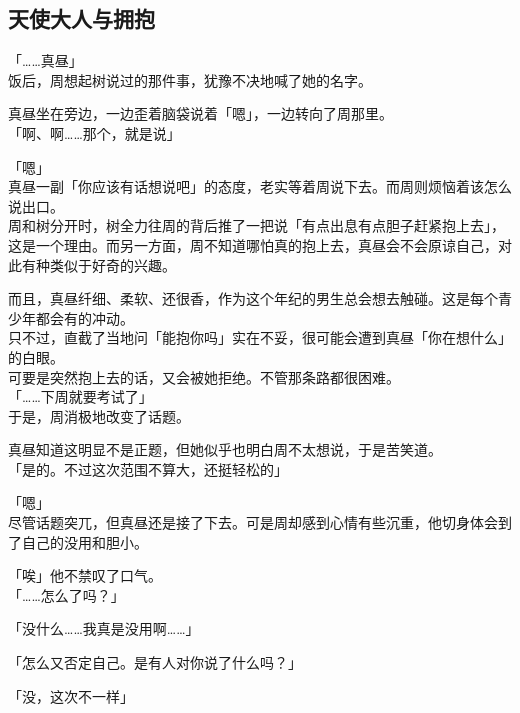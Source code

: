 \subsection{天使大人与拥抱}

「……真昼」\\

饭后，周想起树说过的那件事，犹豫不决地喊了她的名字。

真昼坐在旁边，一边歪着脑袋说着「嗯」，一边转向了周那里。\\

「啊、啊……那个，就是说」

「嗯」\\

真昼一副「你应该有话想说吧」的态度，老实等着周说下去。而周则烦恼着该怎么说出口。\\

周和树分开时，树全力往周的背后推了一把说「有点出息有点胆子赶紧抱上去」，这是一个理由。而另一方面，周不知道哪怕真的抱上去，真昼会不会原谅自己，对此有种类似于好奇的兴趣。

而且，真昼纤细、柔软、还很香，作为这个年纪的男生总会想去触碰。这是每个青少年都会有的冲动。\\

只不过，直截了当地问「能抱你吗」实在不妥，很可能会遭到真昼「你在想什么」的白眼。\\

可要是突然抱上去的话，又会被她拒绝。不管那条路都很困难。\\

「……下周就要考试了」\\

于是，周消极地改变了话题。

真昼知道这明显不是正题，但她似乎也明白周不太想说，于是苦笑道。\\

「是的。不过这次范围不算大，还挺轻松的」

「嗯」\\

尽管话题突兀，但真昼还是接了下去。可是周却感到心情有些沉重，他切身体会到了自己的没用和胆小。

「唉」他不禁叹了口气。\\

「……怎么了吗？」

「没什么……我真是没用啊……」

「怎么又否定自己。是有人对你说了什么吗？」

「没，这次不一样」\\

